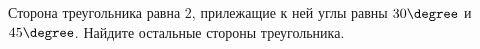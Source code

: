 \begin{ex}
	\begin{condition}
		Сторона треугольника равна \( 2 \), прилежащие к ней углы равны \( 30\degree \) и \( 45\degree \). Найдите остальные стороны треугольника.
	\end{condition}
\end{ex}